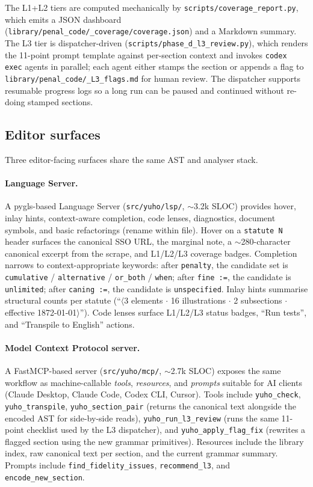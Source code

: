 The L1+L2 tiers are computed mechanically by
\texttt{scripts/coverage\_report.py}, which emits a JSON dashboard
(\texttt{library/penal\_code/\_coverage/coverage.json}) and a Markdown
summary. The L3 tier is dispatcher-driven
(\texttt{scripts/phase\_d\_l3\_review.py}), which renders the 11-point
prompt template against per-section context and invokes \texttt{codex
exec} agents in parallel; each agent either stamps the section or
appends a flag to \texttt{library/penal\_code/\_L3\_flags.md} for human
review. The dispatcher supports resumable progress logs so a long run
can be paused and continued without re-doing stamped sections.

\subsection{Editor surfaces}
\label{subsec:editors}
Three editor-facing surfaces share the same AST and analyser stack.

\paragraph{Language Server.} A pygls-based Language Server
(\texttt{src/yuho/lsp/}, $\sim$3.2k SLOC) provides hover, inlay hints,
context-aware completion, code lenses, diagnostics, document symbols,
and basic refactorings (rename within file). Hover on a \texttt{statute N}
header surfaces the canonical SSO URL, the marginal note, a $\sim$280-character
canonical excerpt from the scrape, and L1/L2/L3 coverage badges.
Completion narrows to context-appropriate keywords: after \texttt{penalty},
the candidate set is \texttt{cumulative} / \texttt{alternative} /
\texttt{or\_both} / \texttt{when}; after \texttt{fine :=}, the candidate
is \texttt{unlimited}; after \texttt{caning :=}, the candidate is
\texttt{unspecified}. Inlay hints summarise structural counts per statute
(``$\langle 3$ elements $\cdot$ 16 illustrations $\cdot$ 2 subsections
$\cdot$ effective 1872-01-01$\rangle$''). Code lenses surface L1/L2/L3
status badges, ``Run tests'', and ``Transpile to English'' actions.

\paragraph{Model Context Protocol server.} A FastMCP-based server
(\texttt{src/yuho/mcp/}, $\sim$2.7k SLOC) exposes the same workflow as
machine-callable \emph{tools}, \emph{resources}, and \emph{prompts}
suitable for AI clients (Claude Desktop, Claude Code, Codex CLI,
Cursor). Tools include \texttt{yuho\_check}, \texttt{yuho\_transpile},
\texttt{yuho\_section\_pair} (returns the canonical text alongside the
encoded AST for side-by-side reads), \texttt{yuho\_run\_l3\_review}
(runs the same 11-point checklist used by the L3 dispatcher), and
\texttt{yuho\_apply\_flag\_fix} (rewrites a flagged section using the
new grammar primitives). Resources include the library index, raw
canonical text per section, and the current grammar summary. Prompts
include \texttt{find\_fidelity\_issues}, \texttt{recommend\_l3}, and
\texttt{encode\_new\_section}.

